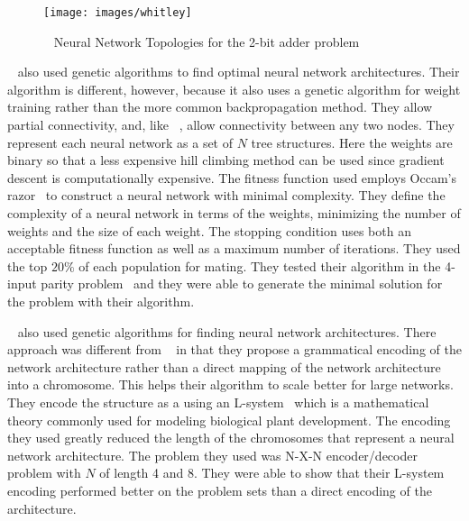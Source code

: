 \begin{figure}[htb!]
  \centering
  \texttt{[image: images/whitley]}
  \caption{~\cite{whitley} Neural Network Topologies for the 2-bit
    adder problem}
  \label{whitley1}
\end{figure}  

~\cite{zhang} also used genetic algorithms to find optimal neural
network architectures. 
Their algorithm is different, however, because it also uses a genetic
algorithm for weight training rather than the more common
backpropagation method.
They allow partial connectivity, and, like ~\cite{whitley}, allow connectivity between any two nodes.
They represent each neural network as a set of $N$ tree structures.
Here the weights are binary so that a less expensive hill climbing
method can be used since gradient descent is computationally
expensive.
The fitness function used employs Occam's razor~\cite{occamsRazor} to construct a neural
network with minimal complexity.
They define the complexity of a neural network in terms of the
weights, minimizing the number of weights and the size of each weight.
The stopping condition uses both an acceptable fitness function as
well as a maximum number of iterations.
They used the top $20\%$ of each population for mating.
They tested their algorithm in the 4-input parity problem~\cite{4bit} and they
were able to generate the minimal solution for the problem with their
algorithm.

~\cite{kitano} also used genetic algorithms for finding neural network
architectures.
There approach was different from ~\cite{whitley} in
that they propose a grammatical encoding of the network architecture
rather than a direct mapping of the network architecture into a
chromosome.
This helps their algorithm to scale better for large networks.
They encode the structure as a using an L-system~\cite{lSystem} which
is a mathematical theory commonly used for modeling biological plant
development.
The encoding they used greatly reduced the length of the chromosomes
that represent a neural network architecture.
The problem they used was N-X-N encoder/decoder
problem with $N$ of length 4 and 8. 
They were able to show that their L-system encoding performed better
on the problem sets than a direct encoding of the architecture.









 

